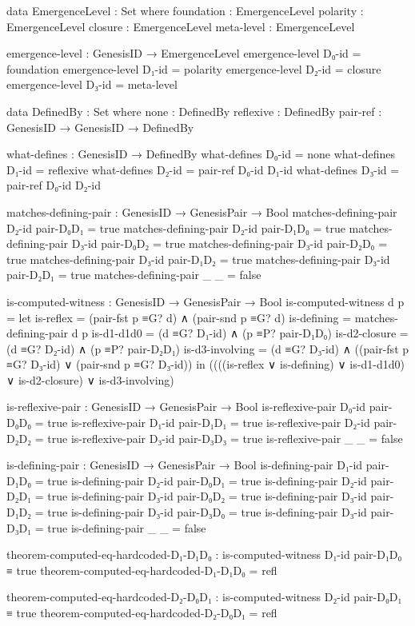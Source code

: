 \documentclass[11pt,a4paper]{book}
\begin{document}
\begin{code}
data EmergenceLevel : Set where
  foundation : EmergenceLevel
  polarity   : EmergenceLevel
  closure    : EmergenceLevel
  meta-level : EmergenceLevel

emergence-level : GenesisID → EmergenceLevel
emergence-level D₀-id = foundation
emergence-level D₁-id = polarity
emergence-level D₂-id = closure
emergence-level D₃-id = meta-level

data DefinedBy : Set where
  none       : DefinedBy
  reflexive  : DefinedBy
  pair-ref   : GenesisID → GenesisID → DefinedBy

what-defines : GenesisID → DefinedBy
what-defines D₀-id = none
what-defines D₁-id = reflexive
what-defines D₂-id = pair-ref D₀-id D₁-id
what-defines D₃-id = pair-ref D₀-id D₂-id

matches-defining-pair : GenesisID → GenesisPair → Bool
matches-defining-pair D₂-id pair-D₀D₁ = true
matches-defining-pair D₂-id pair-D₁D₀ = true
matches-defining-pair D₃-id pair-D₀D₂ = true
matches-defining-pair D₃-id pair-D₂D₀ = true
matches-defining-pair D₃-id pair-D₁D₂ = true
matches-defining-pair D₃-id pair-D₂D₁ = true
matches-defining-pair _     _         = false

is-computed-witness : GenesisID → GenesisPair → Bool
is-computed-witness d p = 
  let is-reflex = (pair-fst p ≡G? d) ∧ (pair-snd p ≡G? d)
      is-defining = matches-defining-pair d p
      is-d1-d1d0 = (d ≡G? D₁-id) ∧ (p ≡P? pair-D₁D₀)
      is-d2-closure = (d ≡G? D₂-id) ∧ (p ≡P? pair-D₂D₁)
      is-d3-involving = (d ≡G? D₃-id) ∧ ((pair-fst p ≡G? D₃-id) ∨ (pair-snd p ≡G? D₃-id))
  in ((((is-reflex ∨ is-defining) ∨ is-d1-d1d0) ∨ is-d2-closure) ∨ is-d3-involving)

is-reflexive-pair : GenesisID → GenesisPair → Bool
is-reflexive-pair D₀-id pair-D₀D₀ = true
is-reflexive-pair D₁-id pair-D₁D₁ = true
is-reflexive-pair D₂-id pair-D₂D₂ = true
is-reflexive-pair D₃-id pair-D₃D₃ = true
is-reflexive-pair _     _         = false

is-defining-pair : GenesisID → GenesisPair → Bool
is-defining-pair D₁-id pair-D₁D₀ = true
is-defining-pair D₂-id pair-D₀D₁ = true
is-defining-pair D₂-id pair-D₂D₁ = true
is-defining-pair D₃-id pair-D₀D₂ = true
is-defining-pair D₃-id pair-D₁D₂ = true
is-defining-pair D₃-id pair-D₃D₀ = true
is-defining-pair D₃-id pair-D₃D₁ = true
is-defining-pair _     _         = false

theorem-computed-eq-hardcoded-D₁-D₁D₀ : is-computed-witness D₁-id pair-D₁D₀ ≡ true
theorem-computed-eq-hardcoded-D₁-D₁D₀ = refl

theorem-computed-eq-hardcoded-D₂-D₀D₁ : is-computed-witness D₂-id pair-D₀D₁ ≡ true
theorem-computed-eq-hardcoded-D₂-D₀D₁ = refl


\end{code}
\end{document}
